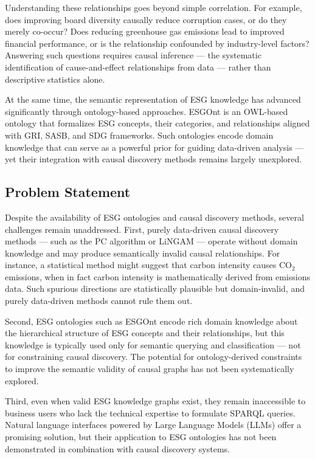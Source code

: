 \documentclass[a4paper,11pt,oneside]{article}
\begin{document}
Understanding these relationships goes beyond simple correlation. For example, does improving board diversity causally reduce corruption cases, or do they merely co-occur? Does reducing greenhouse gas emissions lead to improved financial performance, or is the relationship confounded by industry-level factors? Answering such questions requires causal inference — the systematic identification of cause-and-effect relationships from data — rather than descriptive statistics alone.

At the same time, the semantic representation of ESG knowledge has advanced significantly through ontology-based approaches. ESGOnt \cite{wicaksono2022} is an OWL-based ontology that formalizes ESG concepts, their categories, and relationships aligned with GRI, SASB, and SDG frameworks. Such ontologies encode domain knowledge that can serve as a powerful prior for guiding data-driven analysis — yet their integration with causal discovery methods remains largely unexplored.

\subsection{Problem Statement}

Despite the availability of ESG ontologies and causal discovery methods, several challenges remain unaddressed. First, purely data-driven causal discovery methods — such as the PC algorithm or LiNGAM — operate without domain knowledge and may produce semantically invalid causal relationships. For instance, a statistical method might suggest that carbon intensity causes CO$_2$ emissions, when in fact carbon intensity is mathematically derived from emissions data. Such spurious directions are statistically plausible but domain-invalid, and purely data-driven methods cannot rule them out.

Second, ESG ontologies such as ESGOnt encode rich domain knowledge about the hierarchical structure of ESG concepts and their relationships, but this knowledge is typically used only for semantic querying and classification — not for constraining causal discovery. The potential for ontology-derived constraints to improve the semantic validity of causal graphs has not been systematically explored.

Third, even when valid ESG knowledge graphs exist, they remain inaccessible to business users who lack the technical expertise to formulate SPARQL queries. Natural language interfaces powered by Large Language Models (LLMs) offer a promising solution, but their application to ESG ontologies has not been demonstrated in combination with causal discovery systems.
\end{document}
